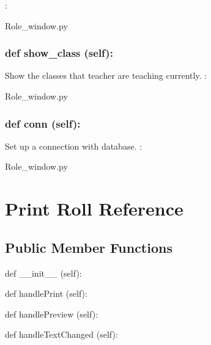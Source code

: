 :\begin{DoxyCompactItemize}
\item 
Role\_window.\-py\end{DoxyCompactItemize}

\hypertarget{class_poly_a14a7ad77ce612b0c54f531d307ee4b39}{
\subsubsection[{def show_class (self):}]{\setlength{\rightskip}{0pt plus 5cm}def {show\_class} (self):}}\label{class_poly_a14a7ad77ce612b0c54f531d307ee4b39}
Show the classes that teacher are teaching currently.
:\begin{DoxyCompactItemize}
\item 
Role\_window.\-py\end{DoxyCompactItemize}


\hypertarget{class_poly_a14a7ad77ce612b0c54f531d307ee4b39}{
\subsubsection[{def conn (self):}]{\setlength{\rightskip}{0pt plus 5cm}def {conn} (self):}}\label{class_poly_a14a7ad77ce612b0c54f531d307ee4b39}
Set up a connection with database.
:\begin{DoxyCompactItemize}
\item 
Role\_window.\-py\end{DoxyCompactItemize}


\hypertarget{Print_Roll}{\section{Print Roll Reference}
\label{Print_Roll}
}
\subsection*{Public Member Functions}
\begin{DoxyCompactItemize}
\item 
def {\_\_init\_\_} (self):
\item 
def {handlePrint} (self):
\item 
def {handlePreview} (self):
\item 
def {handleTextChanged} (self):

\end{DoxyCompactItemize}

